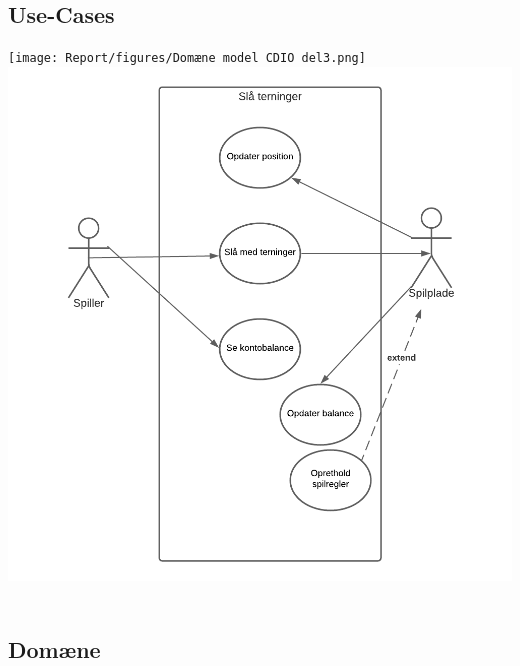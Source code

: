 \subsection{Use-Cases}
\texttt{[image: Report/figures/Domæne model CDIO del3.png]}~\\[1cm]

\includegraphics[width=1\textwidth]{Report/figures/Use case diagram CDIO del3.png}~\\[1cm]


\subsection{Domæne}